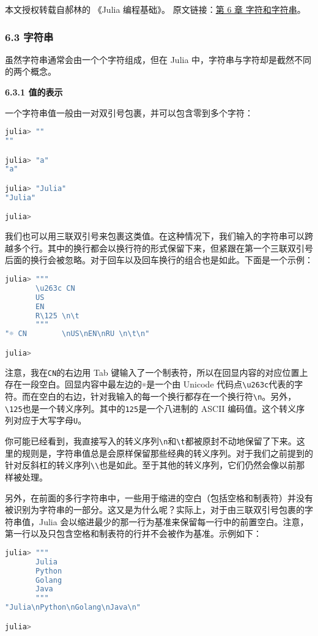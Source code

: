 
本文授权转载自郝林的 《Julia 编程基础》。 原文链接：\href{https://github.com/hyper0x/JuliaBasics/blob/master/book/ch06.md}{第 6 章 字符和字符串}。


\subsubsection{6.3 字符串}

虽然字符串通常会由一个个字符组成，但在 Julia 中，字符串与字符却是截然不同的两个概念。

\textbf{6.3.1 值的表示}

一个字符串值一般由一对双引号包裹，并可以包含零到多个字符：
\begin{lstlisting}[language=julia]
julia> ""
""

julia> "a"
"a"

julia> "Julia"
"Julia"

julia> 
\end{lstlisting}

我们也可以用三联双引号来包裹这类值。在这种情况下，我们输入的字符串可以跨越多个行。其中的换行都会以换行符的形式保留下来，但紧跟在第一个三联双引号后面的换行会被忽略。对于回车以及回车换行的组合也是如此。下面是一个示例：
\begin{lstlisting}[language=julia]
julia> """
       \u263c CN        
       US
       EN
       R\125 \n\t
       """
"☼ CN        \nUS\nEN\nRU \n\t\n"

julia> 
\end{lstlisting}

注意，我在\verb`CN`的右边用 Tab 键输入了一个制表符，所以在回显内容的对应位置上存在一段空白。回显内容中最左边的\verb`☼`是一个由 Unicode 代码点\verb`\u263c`代表的字符。而在空白的右边，针对我输入的每一个换行都存在一个换行符\verb`\n`。另外，\verb`\125`也是一个转义序列。其中的\verb`125`是一个八进制的 ASCII 编码值。这个转义序列对应于大写字母\verb`U`。

你可能已经看到，我直接写入的转义序列\verb`\n`和\verb`\t`都被原封不动地保留了下来。这里的规则是，字符串值总是会原样保留那些经典的转义序列。对于我们之前提到的针对反斜杠的转义序列\verb`\\`也是如此。至于其他的转义序列，它们仍然会像以前那样被处理。

另外，在前面的多行字符串中，一些用于缩进的空白（包括空格和制表符）并没有被识别为字符串的一部分。这又是为什么呢？实际上，对于由三联双引号包裹的字符串值，Julia 会以缩进最少的那一行为基准来保留每一行中的前置空白。注意，第一行以及只包含空格和制表符的行并不会被作为基准。示例如下：
\begin{lstlisting}[language=julia]
julia> """
       Julia
       Python
       Golang
       Java
       """
"Julia\nPython\nGolang\nJava\n"

julia> 
\end{lstlisting}

